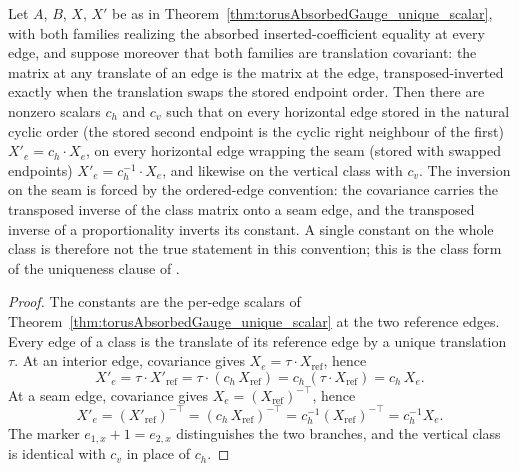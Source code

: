 \begin{theorem}%
    \label{thm:torusCovariantAbsorbedGauge_unique_classScalar}
    \leanok
    Let $A$, $B$, $X$, $X'$ be as in
    Theorem~\ref{thm:torusAbsorbedGauge_unique_scalar}, with both families
    realizing the absorbed inserted-coefficient equality at every edge, and
    suppose moreover that both families are translation covariant: the matrix
    at any translate of an edge is the matrix at the edge, transposed-inverted
    exactly when the translation swaps the stored endpoint order.  Then there
    are nonzero scalars $c_h$ and $c_v$ such that on every horizontal edge
    stored in the natural cyclic order (the stored second endpoint is the
    cyclic right neighbour of the first) $X'_e = c_h\cdot X_e$, on every
    horizontal edge wrapping the seam (stored with swapped endpoints)
    $X'_e = c_h^{-1}\cdot X_e$, and likewise on the vertical class with $c_v$.
    The inversion on the seam is forced by the ordered-edge convention: the
    covariance carries the transposed inverse of the class matrix onto a seam
    edge, and the transposed inverse of a proportionality inverts its
    constant.  A single constant on the whole class is therefore not the true
    statement in this convention; this is the class form of the uniqueness
    clause of \cite[Theorem~3]{Molnar2018NormalPEPS}.
    \begin{proof}
        \leanok
        The constants are the per-edge scalars of
        Theorem~\ref{thm:torusAbsorbedGauge_unique_scalar} at the two
        reference edges.  Every edge of a class is the translate of its
        reference edge by a unique translation $\tau$. At an interior edge,
        covariance gives $X_e=\tau\cdot X_{\mathrm{ref}}$, hence
        \[
            X'_e
            =
            \tau\cdot X'_{\mathrm{ref}}
            =
            \tau\cdot(c_h\,X_{\mathrm{ref}})
            =
            c_h\,(\tau\cdot X_{\mathrm{ref}})
            =
            c_h\,X_e.
        \]
        At a seam edge, covariance gives $X_e=(X_{\mathrm{ref}})^{-\top}$,
        hence
        \[
            X'_e
            =
            (X'_{\mathrm{ref}})^{-\top}
            =
            (c_h\,X_{\mathrm{ref}})^{-\top}
            =
            c_h^{-1}(X_{\mathrm{ref}})^{-\top}
            =
            c_h^{-1}X_e.
        \]
        The marker $e_{1,x}+1=e_{2,x}$ distinguishes the two branches, and the
        vertical class is identical with $c_v$ in place of $c_h$.
    \end{proof}
\end{theorem}

